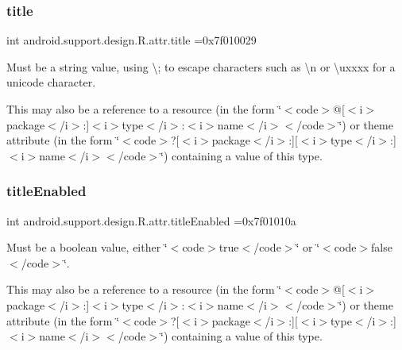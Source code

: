 \subsubsection{\texorpdfstring{title}{title}}
{\footnotesize\ttfamily int android.\+support.\+design.\+R.\+attr.\+title =0x7f010029\hspace{0.3cm}{\ttfamily [static]}}

Must be a string value, using \textquotesingle{}\textbackslash{};\textquotesingle{} to escape characters such as \textquotesingle{}\textbackslash{}n\textquotesingle{} or \textquotesingle{}\textbackslash{}uxxxx\textquotesingle{} for a unicode character. 

This may also be a reference to a resource (in the form \char`\"{}$<$code$>$@\mbox{[}$<$i$>$package$<$/i$>$\+:\mbox{]}$<$i$>$type$<$/i$>$\+:$<$i$>$name$<$/i$>$$<$/code$>$\char`\"{}) or theme attribute (in the form \char`\"{}$<$code$>$?\mbox{[}$<$i$>$package$<$/i$>$\+:\mbox{]}\mbox{[}$<$i$>$type$<$/i$>$\+:\mbox{]}$<$i$>$name$<$/i$>$$<$/code$>$\char`\"{}) containing a value of this type. \mbox{\label{classandroid_1_1support_1_1design_1_1R_1_1attr_a67eaab883b378bf1d3a7ec621e393f22}} 
\subsubsection{\texorpdfstring{title\+Enabled}{titleEnabled}}
{\footnotesize\ttfamily int android.\+support.\+design.\+R.\+attr.\+title\+Enabled =0x7f01010a\hspace{0.3cm}{\ttfamily [static]}}

Must be a boolean value, either \char`\"{}$<$code$>$true$<$/code$>$\char`\"{} or \char`\"{}$<$code$>$false$<$/code$>$\char`\"{}. 

This may also be a reference to a resource (in the form \char`\"{}$<$code$>$@\mbox{[}$<$i$>$package$<$/i$>$\+:\mbox{]}$<$i$>$type$<$/i$>$\+:$<$i$>$name$<$/i$>$$<$/code$>$\char`\"{}) or theme attribute (in the form \char`\"{}$<$code$>$?\mbox{[}$<$i$>$package$<$/i$>$\+:\mbox{]}\mbox{[}$<$i$>$type$<$/i$>$\+:\mbox{]}$<$i$>$name$<$/i$>$$<$/code$>$\char`\"{}) containing a value of this type. \mbox{\label{classandroid_1_1support_1_1design_1_1R_1_1attr_a2fb2f463c0477f1585632b5312aa22dc}} 

